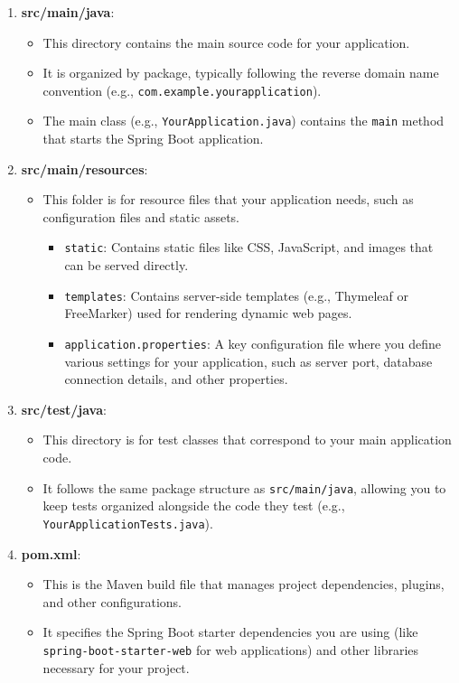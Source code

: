 \documentclass{article}
\begin{document}
\begin{enumerate}
    \item \textbf{src/main/java}: 
    \begin{itemize}
        \item This directory contains the main source code for your application.
        \item It is organized by package, typically following the reverse domain name convention (e.g., \texttt{com.example.yourapplication}).
        \item The main class (e.g., \texttt{YourApplication.java}) contains the \texttt{main} method that starts the Spring Boot application.
    \end{itemize}

    \item \textbf{src/main/resources}:
    \begin{itemize}
        \item This folder is for resource files that your application needs, such as configuration files and static assets.
        \begin{itemize}
            \item \texttt{static}: Contains static files like CSS, JavaScript, and images that can be served directly.
            \item \texttt{templates}: Contains server-side templates (e.g., Thymeleaf or FreeMarker) used for rendering dynamic web pages.
            \item \texttt{application.properties}: A key configuration file where you define various settings for your application, such as server port, database connection details, and other properties.
        \end{itemize}
    \end{itemize}

    \item \textbf{src/test/java}:
    \begin{itemize}
        \item This directory is for test classes that correspond to your main application code.
        \item It follows the same package structure as \texttt{src/main/java}, allowing you to keep tests organized alongside the code they test (e.g., \texttt{YourApplicationTests.java}).
    \end{itemize}



    \item \textbf{pom.xml}:
    \begin{itemize}
        \item This is the Maven build file that manages project dependencies, plugins, and other configurations.
        \item It specifies the Spring Boot starter dependencies you are using (like \texttt{spring-boot-starter-web} for web applications) and other libraries necessary for your project.
    \end{itemize}


\end{enumerate}
\end{document}
